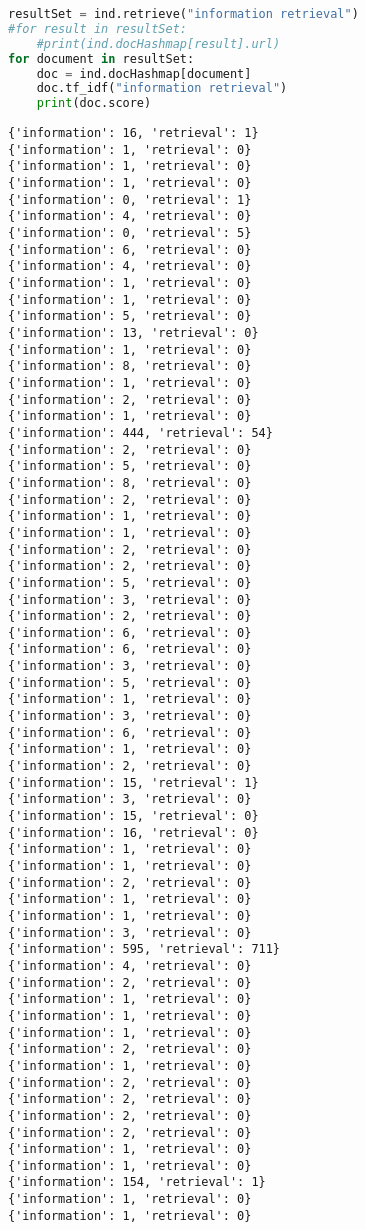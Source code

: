 \begin{lstlisting}[language=Python]
resultSet = ind.retrieve("information retrieval")
#for result in resultSet:
    #print(ind.docHashmap[result].url)
for document in resultSet:
    doc = ind.docHashmap[document]
    doc.tf_idf("information retrieval")
    print(doc.score)
\end{lstlisting}

\begin{lstlisting}
{'information': 16, 'retrieval': 1}
{'information': 1, 'retrieval': 0}
{'information': 1, 'retrieval': 0}
{'information': 1, 'retrieval': 0}
{'information': 0, 'retrieval': 1}
{'information': 4, 'retrieval': 0}
{'information': 0, 'retrieval': 5}
{'information': 6, 'retrieval': 0}
{'information': 4, 'retrieval': 0}
{'information': 1, 'retrieval': 0}
{'information': 1, 'retrieval': 0}
{'information': 5, 'retrieval': 0}
{'information': 13, 'retrieval': 0}
{'information': 1, 'retrieval': 0}
{'information': 8, 'retrieval': 0}
{'information': 1, 'retrieval': 0}
{'information': 2, 'retrieval': 0}
{'information': 1, 'retrieval': 0}
{'information': 444, 'retrieval': 54}
{'information': 2, 'retrieval': 0}
{'information': 5, 'retrieval': 0}
{'information': 8, 'retrieval': 0}
{'information': 2, 'retrieval': 0}
{'information': 1, 'retrieval': 0}
{'information': 1, 'retrieval': 0}
{'information': 2, 'retrieval': 0}
{'information': 2, 'retrieval': 0}
{'information': 5, 'retrieval': 0}
{'information': 3, 'retrieval': 0}
{'information': 2, 'retrieval': 0}
{'information': 6, 'retrieval': 0}
{'information': 6, 'retrieval': 0}
{'information': 3, 'retrieval': 0}
{'information': 5, 'retrieval': 0}
{'information': 1, 'retrieval': 0}
{'information': 3, 'retrieval': 0}
{'information': 6, 'retrieval': 0}
{'information': 1, 'retrieval': 0}
{'information': 2, 'retrieval': 0}
{'information': 15, 'retrieval': 1}
{'information': 3, 'retrieval': 0}
{'information': 15, 'retrieval': 0}
{'information': 16, 'retrieval': 0}
{'information': 1, 'retrieval': 0}
{'information': 1, 'retrieval': 0}
{'information': 2, 'retrieval': 0}
{'information': 1, 'retrieval': 0}
{'information': 1, 'retrieval': 0}
{'information': 3, 'retrieval': 0}
{'information': 595, 'retrieval': 711}
{'information': 4, 'retrieval': 0}
{'information': 2, 'retrieval': 0}
{'information': 1, 'retrieval': 0}
{'information': 1, 'retrieval': 0}
{'information': 1, 'retrieval': 0}
{'information': 2, 'retrieval': 0}
{'information': 1, 'retrieval': 0}
{'information': 2, 'retrieval': 0}
{'information': 2, 'retrieval': 0}
{'information': 2, 'retrieval': 0}
{'information': 2, 'retrieval': 0}
{'information': 1, 'retrieval': 0}
{'information': 1, 'retrieval': 0}
{'information': 154, 'retrieval': 1}
{'information': 1, 'retrieval': 0}
{'information': 1, 'retrieval': 0}
\end{lstlisting}

\begin{lstlisting}[language=Python]
\end{lstlisting}

